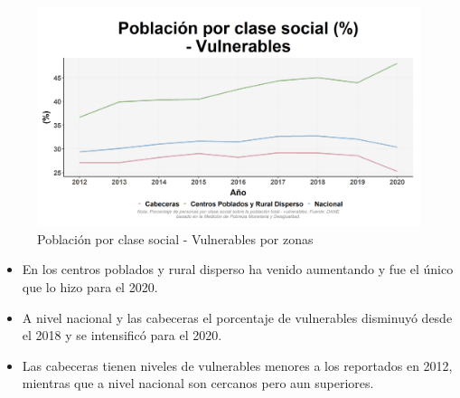     \begin{figure}[H]
        \caption{Población por clase social - Vulnerables por zonas \label{map_result_2} }
        \begin{center}
        \includegraphics[width=\textwidth,keepaspectratio]{img/var_246_trend.png}
        \end{center}
    \end{figure}
            \begin{itemize}
                    \item En los centros poblados y rural disperso ha venido aumentando y fue el único que lo hizo para el 2020.
                    \item A nivel nacional y las cabeceras el porcentaje de vulnerables disminuyó desde el 2018 y se intensificó para el 2020.
                    \item Las cabeceras tienen niveles de vulnerables menores a los reportados en 2012, mientras que a nivel nacional son cercanos pero aun superiores.
                    \end{itemize}


